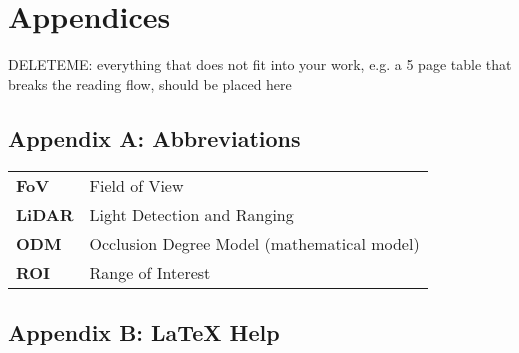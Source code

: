 \chapter*{Appendices}
\label{appendices}
DELETEME: everything that does not fit into your work, e.g. a 5 page table that breaks the reading flow, should be placed here

{}
\section*{Appendix A: Abbreviations}
\begin{center}
\begin{tabular}{ll}
\textbf{FoV}	&	Field of View\\
\textbf{LiDAR}	&	Light Detection and Ranging\\
\textbf{ODM}	&	Occlusion Degree Model (mathematical model)\\
\textbf{ROI}	&	Range of Interest\\
\end{tabular}
\end{center}

\newpage
\section*{Appendix B: {\LaTeX} Help}

